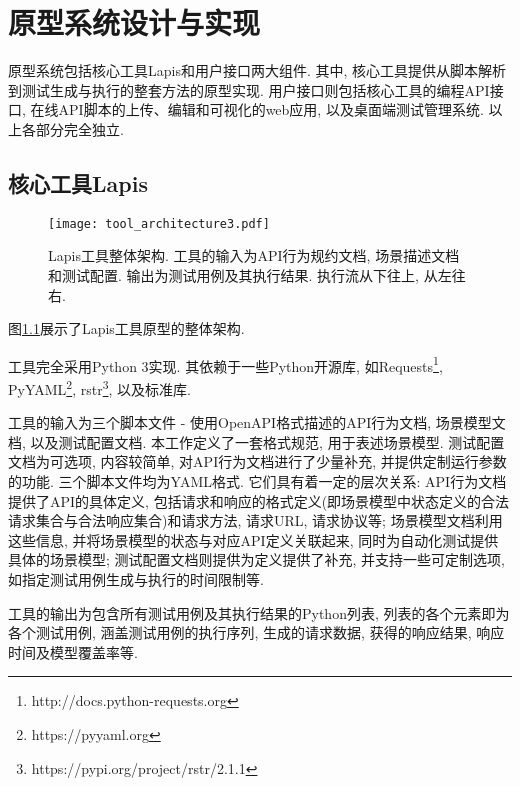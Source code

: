 \chapter{原型系统设计与实现}

    原型系统包括核心工具Lapis和用户接口两大组件. 其中, 核心工具提供从脚本解析到测试生成与执行的整套方法的原型实现. 用户接口则包括核心工具的编程API接口, 在线API脚本的上传、编辑和可视化的web应用, 以及桌面端测试管理系统. 以上各部分完全独立.

	\section{核心工具Lapis}
	
	    \begin{figure}
	        \centering
	        \texttt{[image: tool\_architecture3.pdf]}
	        \caption{Lapis工具整体架构. 工具的输入为API行为规约文档, 场景描述文档和测试配置. 输出为测试用例及其执行结果. 执行流从下往上, 从左往右.}
	        \label{fig:lapis_arch}
	    \end{figure}
	    
	    图\ref{fig:lapis_arch}展示了Lapis工具原型的整体架构.
	    
	    工具完全采用Python 3实现. 其依赖于一些Python开源库, 如Requests\footnote{http://docs.python-requests.org}, PyYAML\footnote{https://pyyaml.org}, rstr\footnote{https://pypi.org/project/rstr/2.1.1}, 以及标准库.
	    
	    工具的输入为三个脚本文件 - 使用OpenAPI格式描述的API行为文档, 场景模型文档, 以及测试配置文档. 本工作定义了一套格式规范, 用于表述场景模型. 测试配置文档为可选项, 内容较简单, 对API行为文档进行了少量补充, 并提供定制运行参数的功能. 三个脚本文件均为YAML格式. 它们具有着一定的层次关系: API行为文档提供了API的具体定义, 包括请求和响应的格式定义(即场景模型中状态定义的合法请求集合与合法响应集合)和请求方法, 请求URL, 请求协议等; 场景模型文档利用这些信息, 并将场景模型的状态与对应API定义关联起来, 同时为自动化测试提供具体的场景模型; 测试配置文档则提供为定义提供了补充, 并支持一些可定制选项, 如指定测试用例生成与执行的时间限制等.
	    
	    \label{sec:lapis_impl}
	    工具的输出为包含所有测试用例及其执行结果的Python列表, 列表的各个元素即为各个测试用例, 涵盖测试用例的执行序列, 生成的请求数据, 获得的响应结果, 响应时间及模型覆盖率等.


